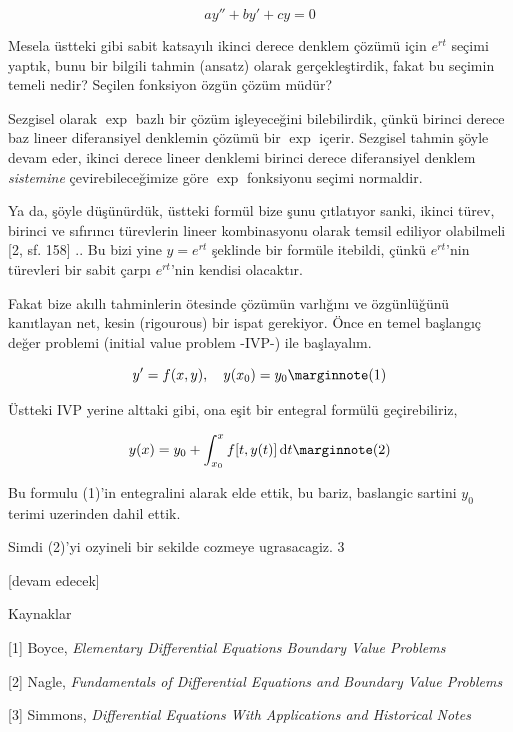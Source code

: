 \documentclass[12pt,fleqn]{article}\usepackage{../../common}
\begin{document}
$$
ay'' + by' + cy = 0
$$

Mesela üstteki gibi sabit katsayılı ikinci derece denklem çözümü için $e^{rt}$
seçimi yaptık, bunu bir bilgili tahmin (ansatz) olarak gerçekleştirdik, fakat bu
seçimin temeli nedir? Seçilen fonksiyon özgün çözüm müdür?

Sezgisel olarak $\exp$ bazlı bir çözüm işleyeceğini bilebilirdik, çünkü birinci
derece baz lineer diferansiyel denklemin çözümü bir $\exp$ içerir. Sezgisel
tahmin şöyle devam eder, ikinci derece lineer denklemi birinci derece
diferansiyel denklem {\em sistemine} çevirebileceğimize göre $\exp$ fonksiyonu
seçimi normaldir.

Ya da, şöyle düşünürdük, üstteki formül bize şunu çıtlatıyor sanki, ikinci
türev, birinci ve sıfırıncı türevlerin lineer kombinasyonu olarak temsil
ediliyor olabilmeli [2, sf. 158] .. Bu bizi yine $y = e^{rt}$ şeklinde bir
formüle itebildi, çünkü $e^{rt}$'nin türevleri bir sabit çarpı $e^{rt}$'nin
kendisi olacaktır.

Fakat bize akıllı tahminlerin ötesinde çözümün varlığını ve özgünlüğünü
kanıtlayan net, kesin (rigourous) bir ispat gerekiyor. Önce en temel başlangıç
değer problemi (initial value problem -IVP-) ile başlayalım.

$$
y' = f(x,y), \quad y(x_0) = y_0
\mlabel{1}
$$

Üstteki IVP yerine alttaki gibi, ona eşit bir entegral formülü geçirebiliriz,

$$
y(x) = y_0 + \int_{x_0}^{x} f[t, y(t)] \ud t
\mlabel{2}
$$

Bu formulu (1)'in entegralini alarak elde ettik, bu bariz, baslangic sartini
$y_0$ terimi uzerinden dahil ettik.

Simdi (2)'yi ozyineli bir sekilde cozmeye ugrasacagiz. 3














[devam edecek]

Kaynaklar

[1] Boyce, {\em Elementary Differential Equations Boundary Value Problems}

[2] Nagle, {\em Fundamentals of Differential Equations and Boundary Value Problems}

[3] Simmons, {\em Differential Equations With Applications and Historical Notes}
\end{document}
